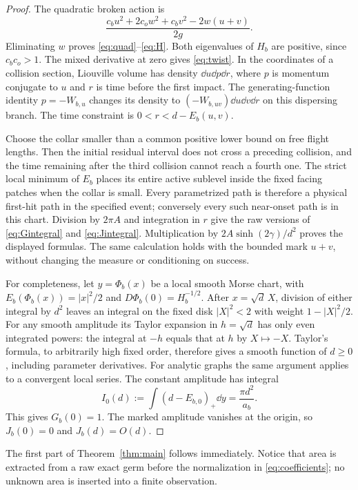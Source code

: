\begin{proof}
The quadratic broken action is
\[
 \frac{c_bu^2+2c_ow^2+c_bv^2-2w(u+v)}{2g}.
\]
Eliminating $w$ proves \eqref{eq:quad}--\eqref{eq:H}.
Both eigenvalues of $H_b$ are positive, since $c_bc_o>1$.
The mixed derivative at zero gives \eqref{eq:twist}.
In the coordinates of a collision section, Liouville volume has density
$\dd u\dd p\dd r$, where $p$ is momentum conjugate to $u$ and $r$
is time before the first impact. The generating-function identity
$p=-W_{b,u}$ changes its density to
$(-W_{b,uv})\dd u\dd v\dd r$ on this dispersing branch.
The time constraint is $0<r<d-E_b(u,v)$.

Choose the collar smaller than a common positive lower bound on free
flight lengths. Then the initial residual interval does not cross a
preceding collision, and the time remaining after the third collision
cannot reach a fourth one. The strict local minimum of $E_b$ places
its entire active sublevel inside the fixed facing patches when the
collar is small. Every parametrized path is therefore a physical first-hit
path in the specified event; conversely every such near-onset path is
in this chart. Division by $2\pi A$ and integration in $r$ give the raw
versions of \eqref{eq:Gintegral} and \eqref{eq:Jintegral}.
Multiplication by $2A\sinh(2\gamma)/d^2$ proves the displayed formulas.
The same calculation holds with the bounded mark $u+v$, without
changing the measure or conditioning on success.

For completeness, let $y=\Phi_b(x)$ be a local smooth Morse chart,
with $E_b(\Phi_b(x))=|x|^2/2$ and $D\Phi_b(0)=H_b^{-1/2}$.
After $x=\sqrt d\,X$, division of either integral by $d^2$ leaves
an integral on the fixed disk $|X|^2<2$ with weight $1-|X|^2/2$.
For any smooth amplitude its Taylor expansion in $h=\sqrt d$ has only
even integrated powers: the integral at $-h$ equals that at $h$ by
$X\mapsto-X$. Taylor's formula, to arbitrarily high fixed order,
therefore gives a smooth function of $d\ge0$, including parameter
derivatives. For analytic graphs the same argument applies to a
convergent local series. The constant amplitude has integral
\[
 I_0(d):=\int(d-E_{b,0})_+\dd y=\frac{\pi d^2}{a_b}.
\]
This gives $G_b(0)=1$. The marked amplitude vanishes at the origin,
so $J_b(0)=0$ and $J_b(d)=O(d)$.
\end{proof}

The first part of Theorem~\ref{thm:main} follows immediately. Notice
that area is extracted from a raw exact germ before the normalization
in \eqref{eq:coefficients}; no unknown area is inserted into a finite
observation.
